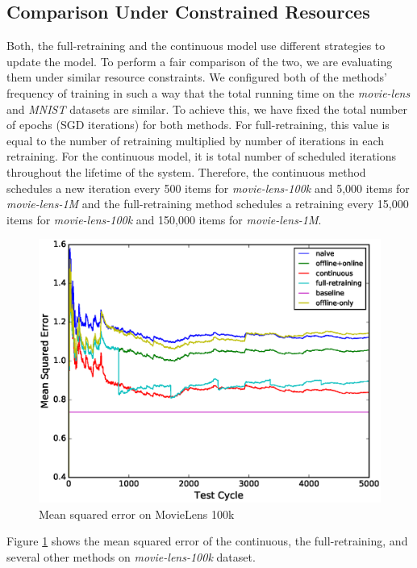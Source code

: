 \documentclass{sig-alternate-05-2015}
\begin{document}
\subsection{Comparison Under Constrained Resources }
Both, the full-retraining and the continuous model use different strategies to update the model.
To perform a fair comparison of the two, we are evaluating them under similar resource constraints.
We configured both of the methods' frequency of training in such a way that the total running time on the \textit{movie-lens} and \textit{MNIST} datasets are similar.
To achieve this, we have fixed the total number of epochs (SGD iterations) for both methods.
For full-retraining, this value is equal to the number of retraining multiplied by number of iterations in each retraining. 
For the continuous model, it is total number of scheduled iterations throughout the lifetime of the system.
Therefore, the continuous method schedules a new iteration every 500 items for \textit{movie-lens-100k} and 5,000 items for \textit{movie-lens-1M} and the full-retraining method schedules a retraining every 15,000 items for \textit{movie-lens-100k} and 150,000 items for \textit{movie-lens-1M}.
\begin{figure}[h]
\centering
\includegraphics[width=\columnwidth]{../images/experiment-results/movie-lens-100k-quality.eps}
\caption{Mean squared error on MovieLens 100k}
\label{fig:movie-lens-100k-score}
\end{figure}
Figure \ref{fig:movie-lens-100k-score} shows the mean squared error of the continuous, the full-retraining, and several other methods on \textit{movie-lens-100k} dataset.
\end{document}
